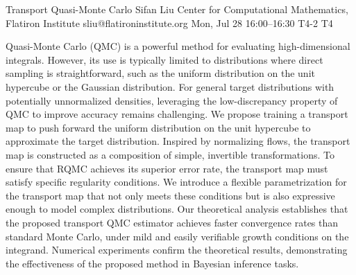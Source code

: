 \begin{talk}
  {Transport Quasi-Monte Carlo}%
  {Sifan Liu}%
  {Center for Computational Mathematics, Flatiron Institute}%
  {sliu@flatironinstitute.org}%
  {}%
  {}%
  {Mon, Jul 28 16:00–16:30}%
  {T4-2}%
  {T4}%
  {}%
  
				
			
Quasi-Monte Carlo (QMC) is a powerful method for evaluating high-dimensional integrals. However, its use is typically limited to distributions where direct sampling is straightforward, such as the uniform distribution on the unit hypercube or the Gaussian distribution. For general target distributions with potentially unnormalized densities, leveraging the low-discrepancy property of QMC to improve accuracy remains challenging. We propose training a transport map to push forward the uniform distribution on the unit hypercube to approximate the target distribution. Inspired by normalizing flows, the transport map is constructed as a composition of simple, invertible transformations. To ensure that RQMC achieves its superior error rate, the transport map must satisfy specific regularity conditions. We introduce a flexible parametrization for the transport map that not only meets these conditions but is also expressive enough to model complex distributions. Our theoretical analysis establishes that the proposed transport QMC estimator achieves faster convergence rates than standard Monte Carlo, under mild and easily verifiable growth conditions on the integrand. Numerical experiments confirm the theoretical results, demonstrating the effectiveness of the proposed method in Bayesian inference tasks.


\medskip


\end{talk}

